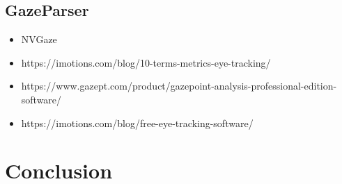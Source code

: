 \documentclass[12pt]{article}
\begin{document}
\subsection{GazeParser}



\begin{itemize}
  \item NVGaze
  \item https://imotions.com/blog/10-terms-metrics-eye-tracking/
  \item https://www.gazept.com/product/gazepoint-analysis-professional-edition-software/
  \item https://imotions.com/blog/free-eye-tracking-software/
\end{itemize}


\section{Conclusion}


\pagebreak


\end{document}
